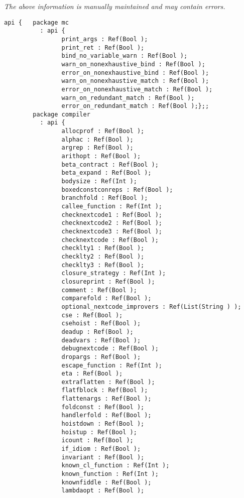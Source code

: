 \label{api:Global\_Controls}

{\tiny \it The above information is manually maintained and may contain errors.}
\begin{verbatim}
api {   package mc
          : api {
                print_args : Ref(Bool );
                print_ret : Ref(Bool );
                bind_no_variable_warn : Ref(Bool );
                warn_on_nonexhaustive_bind : Ref(Bool );
                error_on_nonexhaustive_bind : Ref(Bool );
                warn_on_nonexhaustive_match : Ref(Bool );
                error_on_nonexhaustive_match : Ref(Bool );
                warn_on_redundant_match : Ref(Bool );
                error_on_redundant_match : Ref(Bool );};;
        package compiler
          : api {
                allocprof : Ref(Bool );
                alphac : Ref(Bool );
                argrep : Ref(Bool );
                arithopt : Ref(Bool );
                beta_contract : Ref(Bool );
                beta_expand : Ref(Bool );
                bodysize : Ref(Int );
                boxedconstconreps : Ref(Bool );
                branchfold : Ref(Bool );
                callee_function : Ref(Int );
                checknextcode1 : Ref(Bool );
                checknextcode2 : Ref(Bool );
                checknextcode3 : Ref(Bool );
                checknextcode : Ref(Bool );
                checklty1 : Ref(Bool );
                checklty2 : Ref(Bool );
                checklty3 : Ref(Bool );
                closure_strategy : Ref(Int );
                closureprint : Ref(Bool );
                comment : Ref(Bool );
                comparefold : Ref(Bool );
                optional_nextcode_improvers : Ref(List(String ) );
                cse : Ref(Bool );
                csehoist : Ref(Bool );
                deadup : Ref(Bool );
                deadvars : Ref(Bool );
                debugnextcode : Ref(Bool );
                dropargs : Ref(Bool );
                escape_function : Ref(Int );
                eta : Ref(Bool );
                extraflatten : Ref(Bool );
                flatfblock : Ref(Bool );
                flattenargs : Ref(Bool );
                foldconst : Ref(Bool );
                handlerfold : Ref(Bool );
                hoistdown : Ref(Bool );
                hoistup : Ref(Bool );
                icount : Ref(Bool );
                if_idiom : Ref(Bool );
                invariant : Ref(Bool );
                known_cl_function : Ref(Int );
                known_function : Ref(Int );
                knownfiddle : Ref(Bool );
                lambdaopt : Ref(Bool );

\end{verbatim}
